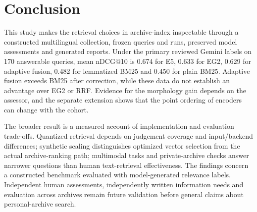 \section{Conclusion}\label{sec:conclusion}

This study makes the retrieval choices in archive-index inspectable through a constructed multilingual collection, frozen queries and runs, preserved model assessments and generated reports. Under the primary reviewed Gemini labels on 170 answerable queries, mean nDCG@10 is 0.674 for E5, 0.633 for EG2, 0.629 for adaptive fusion, 0.482 for lemmatized BM25 and 0.450 for plain BM25. Adaptive fusion exceeds BM25 after correction, while these data do not establish an advantage over EG2 or RRF. Evidence for the morphology gain depends on the assessor, and the separate extension shows that the point ordering of encoders can change with the cohort.

The broader result is a measured account of implementation and evaluation trade-offs. Quantized retrieval depends on judgement coverage and input/backend differences; synthetic scaling distinguishes optimized vector selection from the actual archive-ranking path; multimodal tasks and private-archive checks answer narrower questions than human text-retrieval effectiveness. The findings concern a constructed benchmark evaluated with model-generated relevance labels. Independent human assessments, independently written information needs and evaluation across archives remain future validation before general claims about personal-archive search.
